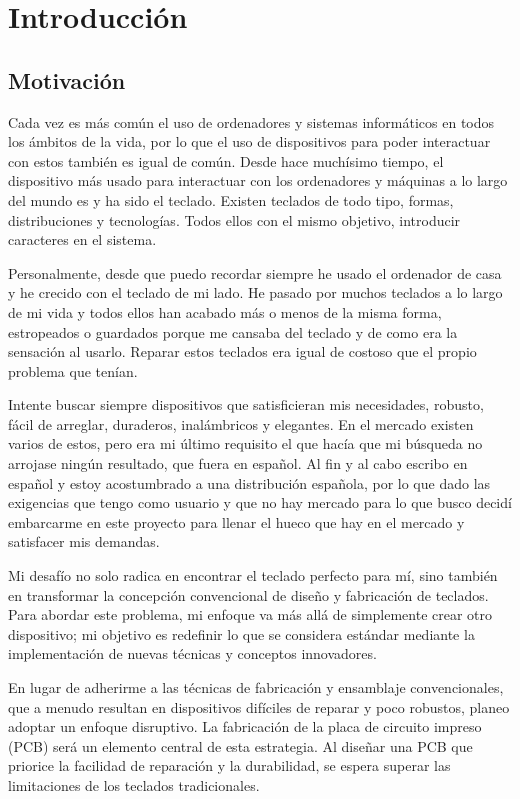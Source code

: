 \chapter{Introducción}
\section{Motivación}

Cada vez es más común el uso de ordenadores y sistemas informáticos en todos los ámbitos de la vida, por lo que el uso de dispositivos para poder interactuar con estos también es igual de común. Desde hace muchísimo tiempo, el dispositivo más usado para interactuar con los ordenadores y máquinas a lo largo del mundo es y ha sido el teclado. Existen teclados de todo tipo, formas, distribuciones y tecnologías. Todos ellos con el mismo objetivo, introducir caracteres en el sistema.

Personalmente, desde que puedo recordar siempre he usado el ordenador de casa y he crecido con el teclado de mi lado. He pasado por muchos teclados a lo largo de mi vida y todos ellos han acabado más o menos de la misma forma, estropeados o guardados porque me cansaba del teclado y de como era la sensación al usarlo. Reparar estos teclados era igual de costoso que el propio problema que tenían.

Intente buscar siempre dispositivos que satisficieran mis necesidades, robusto, fácil de arreglar, duraderos, inalámbricos y elegantes. En el mercado existen varios de estos, pero era mi último requisito el que hacía que mi búsqueda no arrojase ningún resultado, que fuera en español. Al fin y al cabo escribo en español y estoy acostumbrado a una distribución española, por lo que dado las exigencias que tengo como usuario y que no hay mercado para lo que busco decidí embarcarme en este proyecto para llenar el hueco que hay en el mercado y satisfacer mis demandas.

Mi desafío no solo radica en encontrar el teclado perfecto para mí, sino también en transformar la concepción convencional de diseño y fabricación de teclados. Para abordar este problema, mi enfoque va más allá de simplemente crear otro dispositivo; mi objetivo es redefinir lo que se considera estándar mediante la implementación de nuevas técnicas y conceptos innovadores.

En lugar de adherirme a las técnicas de fabricación y ensamblaje convencionales, que a menudo resultan en dispositivos difíciles de reparar y poco robustos, planeo adoptar un enfoque disruptivo. La fabricación de la placa de circuito impreso (PCB) será un elemento central de esta estrategia. Al diseñar una PCB que priorice la facilidad de reparación y la durabilidad, se espera superar las limitaciones de los teclados tradicionales.

